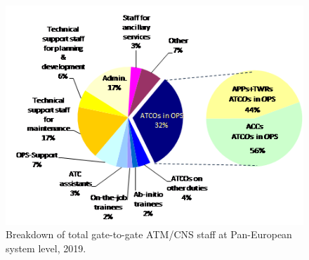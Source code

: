 \documentclass[
]{book}
\begin{document}
\begin{figure}

{\centering \includegraphics[width=1\linewidth]{figures/Figure 2-4} 

}

\caption{Breakdown of total gate-to-gate ATM/CNS staff at Pan-European system level, 2019.}\label{fig:figure7}
\end{figure}
\end{document}
